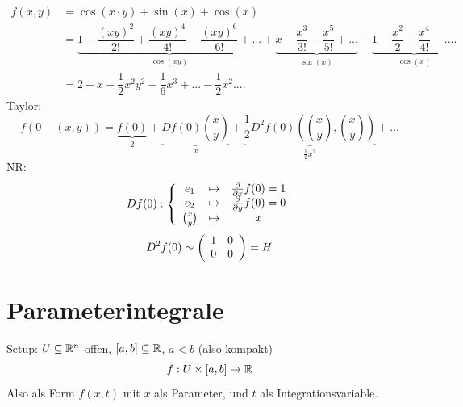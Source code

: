 \documentclass[main.tex]{subfiles}
\begin{document}
\begin{Beispiel}[$n = 2$]
  $$\begin{aligned}
    f(x,y) & = \cos(x \cdot y) + \sin(x) + \cos(x)\\
    & = \underbrace{1 - \dfrac{(xy)^2}{2!}  + \dfrac{(xy)^4}{4!} - \dfrac{(xy)^6}{6!} + ...}_{\cos(xy)} + \underbrace{x - \dfrac{x^3}{3!} + \dfrac{x^5}{5!} + ...}_{\sin(x)} + \underbrace{1 - \dfrac{x^2}{2} + \dfrac{x^4}{4!} - ....}_{\cos(x)} \\
    & = 2 + x - \dfrac{1}{2}x^2y^2 - \dfrac{1}{6}x^3 + ... - \dfrac{1}{2}x^2 ....
  \end{aligned}$$
  Taylor:
  $$f(0 + (x,y)) = \underbrace{f(0)}_{2} + \underbrace{Df(0){x \choose y}}_{x} + \underbrace{\dfrac{1}{2}D^2f(0)\left({x \choose y},{x \choose y}\right)}_{\frac{1}{2}x^2} + ...$$
  NR:
  $$Df(0): \left\{ \begin{array}{c c c}
      e_1 & \mapsto & \frac{\partial}{\partial x}f(0) = 1 \\
      e_2 & \mapsto & \frac{\partial}{\partial y}f(0) = 0 \\
      {x \choose y} & \mapsto & x
  \end{array} \right.$$
  $$D^2f(0) \sim \left(\begin{array}{c c}
    1 & 0 \\
    0 & 0
  \end{array}\right) = H$$
  \begin{center}
  \end{center}
\end{Beispiel}



\section{Parameterintegrale}

Setup: $U \subseteq \mathbb{R}^n$ offen, $[a,b] \subseteq \mathbb{R}$, $a < b$ (also kompakt)
$$f : U \times [a,b] \to \mathbb{R}$$
Also als Form $f(x,t)$ mit $x$ als Parameter, und $t$ als Integrationsvariable.
\end{document}

